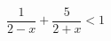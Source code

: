 \begin{ex}[type=inequality]
	\begin{condition}
		\( \dfrac{1}{2-x}+\dfrac{5}{2+x}<1 \)
	\end{condition}
\end{ex}